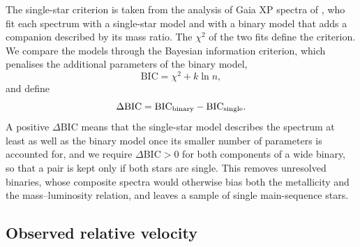\documentclass{aa}
\begin{document}
The single-star criterion is taken from the analysis of Gaia XP spectra of \citet{Li2025BinaryXP}, who fit each spectrum with a single-star model and with a binary model that adds a companion described by its mass ratio. The $\chi^2$ of the two fits define the criterion. We compare the models through the Bayesian information criterion, which penalises the additional parameters of the binary model,
\begin{equation}
 \mathrm{BIC}=\chi^2+k\ln n,
 \label{eq:bic}
\end{equation}
and define
\begin{equation}
 \Delta\mathrm{BIC}=\mathrm{BIC}_{\rm binary}-\mathrm{BIC}_{\rm single}.
 \label{eq:dbic}
\end{equation}
A positive $\Delta\mathrm{BIC}$ means that the single-star model describes the spectrum at least as well as the binary model once its smaller number of parameters is accounted for, and we require $\Delta\mathrm{BIC}>0$ for both components of a wide binary, so that a pair is kept only if both stars are single. This removes unresolved binaries, whose composite spectra would otherwise bias both the metallicity and the mass--luminosity relation, and leaves a sample of single main-sequence stars.

\subsection{Observed relative velocity}
\end{document}
